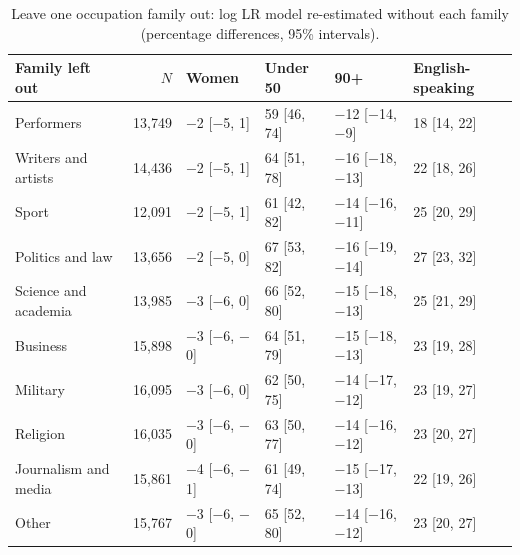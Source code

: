 \documentclass[11pt,a4paper]{article}
\begin{document}
\begin{table}[tbp]\centering\small\caption{Leave one occupation family out: log LR model re-estimated without each family (percentage differences, 95\% intervals).}\label{tab:lofo}\begin{tabular}{lrllll}\toprule Family left out & $N$ & Women & Under 50 & 90+ & English-speaking\\\midrule
Performers & 13,749 & $-$2 [$-$5, 1] & 59 [46, 74] & $-$12 [$-$14, $-$9] & 18 [14, 22]\\
Writers and artists & 14,436 & $-$2 [$-$5, 1] & 64 [51, 78] & $-$16 [$-$18, $-$13] & 22 [18, 26]\\
Sport & 12,091 & $-$2 [$-$5, 1] & 61 [42, 82] & $-$14 [$-$16, $-$11] & 25 [20, 29]\\
Politics and law & 13,656 & $-$2 [$-$5, 0] & 67 [53, 82] & $-$16 [$-$19, $-$14] & 27 [23, 32]\\
Science and academia & 13,985 & $-$3 [$-$6, 0] & 66 [52, 80] & $-$15 [$-$18, $-$13] & 25 [21, 29]\\
Business & 15,898 & $-$3 [$-$6, $-$0] & 64 [51, 79] & $-$15 [$-$18, $-$13] & 23 [19, 28]\\
Military & 16,095 & $-$3 [$-$6, 0] & 62 [50, 75] & $-$14 [$-$17, $-$12] & 23 [19, 27]\\
Religion & 16,035 & $-$3 [$-$6, $-$0] & 63 [50, 77] & $-$14 [$-$16, $-$12] & 23 [20, 27]\\
Journalism and media & 15,861 & $-$4 [$-$6, $-$1] & 61 [49, 74] & $-$15 [$-$17, $-$13] & 22 [19, 26]\\
Other & 15,767 & $-$3 [$-$6, $-$0] & 65 [52, 80] & $-$14 [$-$16, $-$12] & 23 [20, 27]\\
\bottomrule\end{tabular}\end{table}
\end{document}
